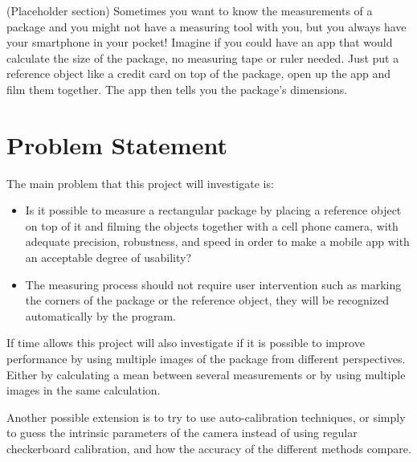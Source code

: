 (Placeholder section) Sometimes you want to know the measurements of a package and you might not have a measuring tool with you, but you always have your smartphone in your pocket! Imagine if you could have an app that would calculate the size of the package, no measuring tape or ruler needed. Just put a reference object like a credit card on top of the package, open up the app and film them together. The app then tells you the package’s dimensions. 
\section{Problem Statement}
The main problem that this project will investigate is:
\begin{itemize}
	\item Is it possible to measure a rectangular package by placing a reference object on top of it and filming the objects together with a cell phone camera, with adequate precision, robustness, and speed in order to make a mobile app with an acceptable degree of usability?
	\item The measuring process should not require user intervention such as marking the corners of the package or the reference object, they will be recognized automatically by the program.
\end{itemize}

If time allows this project will also investigate if it is possible to improve performance by using multiple images of the package from different perspectives.  Either by calculating a mean between several measurements or by using multiple images in the same calculation. 

Another possible extension is to try to use auto-calibration techniques, or simply to guess the intrinsic parameters of the camera instead of using regular checkerboard calibration, and how the accuracy of the different methods compare.
